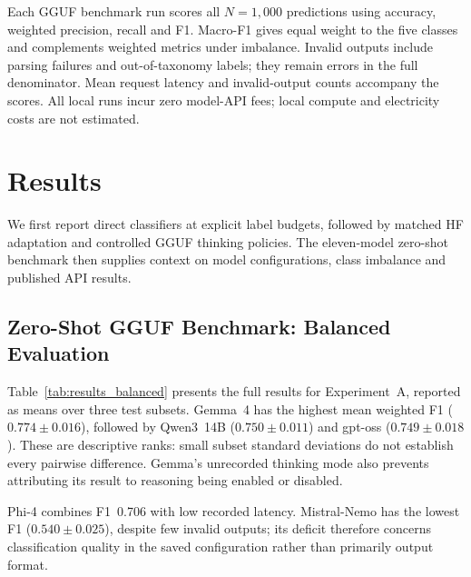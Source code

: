 \documentclass[pdflatex,sn-mathphys-num]{sn-jnl}
\begin{document}
Each GGUF benchmark run scores all $N=1{,}000$ predictions using accuracy,
weighted precision, recall and F1. Macro-F1 gives equal weight to the
five classes and complements weighted metrics under imbalance.
Invalid outputs include parsing failures and out-of-taxonomy labels;
they remain errors in the full denominator. Mean request latency
and invalid-output counts accompany the scores. All local runs incur
zero model-API fees; local compute and electricity costs are not estimated.




\section{Results}
\label{sec:results}

We first report direct classifiers at explicit label budgets, followed
by matched HF adaptation and controlled GGUF thinking policies.
The eleven-model zero-shot benchmark then supplies context
on model configurations, class imbalance and published API results.





\subsection{Zero-Shot GGUF Benchmark: Balanced Evaluation}
\label{sec:zero_shot_results}

Table~\ref{tab:results_balanced} presents the full results for
Experiment~A, reported as means over three test subsets.
Gemma~4 has the highest mean weighted F1 ($0.774\pm0.016$),
followed by Qwen3~14B ($0.750\pm0.011$) and gpt-oss
($0.749\pm0.018$). These are descriptive ranks: small subset standard
deviations do not establish every pairwise difference. Gemma's
unrecorded thinking mode also prevents attributing its result to
reasoning being enabled or disabled.

Phi-4 combines F1~0.706 with low recorded latency. Mistral-Nemo
has the lowest F1 ($0.540\pm0.025$), despite few invalid outputs;
its deficit therefore concerns classification quality in the saved
configuration rather than primarily output format.
\end{document}

